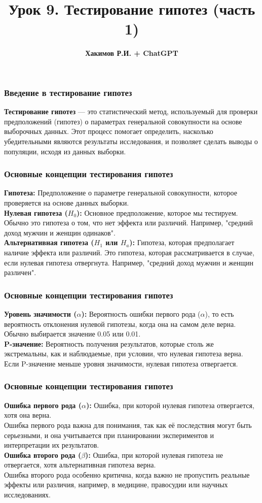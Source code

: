 \documentclass[aspectratio=169]{beamer}
\title{\bf Урок 9. Тестирование гипотез (часть 1)}
\author{{\bf Хакимов Р.И. + ChatGPT}}
\date[\today]{}
\begin{document}
\begin{frame}
\titlepage
\end{frame}

\begin{frame}
\frametitle{Введение в тестирование гипотез}
{\bf Тестирование гипотез} — это статистический метод, используемый для проверки предположений (гипотез) о параметрах генеральной совокупности на основе выборочных данных. Этот процесс помогает определить, насколько убедительными являются результаты исследования, и позволяет сделать выводы о популяции, исходя из данных выборки.
\end{frame}

\begin{frame}
\frametitle{Основные концепции тестирования гипотез}
{\bf Гипотеза:} Предположение о параметре генеральной совокупности, которое проверяется на основе данных выборки.\\  
{\bf Нулевая гипотеза ($H_0$):} Основное предположение, которое мы тестируем. Обычно это гипотеза о том, что нет эффекта или различий. Например, "средний доход мужчин и женщин одинаков".\\
{\bf Альтернативная гипотеза ($H_1$ или $H_a$):} Гипотеза, которая предполагает наличие эффекта или различий. Это гипотеза, которая рассматривается в случае, если нулевая гипотеза отвергнута. Например, "средний доход мужчин и женщин различен".
\end{frame}

\begin{frame}
\frametitle{Основные концепции тестирования гипотез}
{\bf Уровень значимости ($\alpha$):} Вероятность ошибки первого рода ($\alpha$), то есть вероятность отклонения нулевой гипотезы, когда она на самом деле верна. Обычно выбирается значение 0.05 или 0.01.\\
{\bf P-значение:} Вероятность получения результатов, которые столь же экстремальны, как и наблюдаемые, при условии, что нулевая гипотеза верна. Если P-значение меньше уровня значимости, нулевая гипотеза отвергается.
\end{frame}

\begin{frame}
\frametitle{Основные концепции тестирования гипотез}
{\bf Ошибка первого рода ($\alpha$):} Ошибка, при которой нулевая гипотеза отвергается, хотя она верна.\\
Ошибка первого рода важна для понимания, так как её последствия могут быть серьезными, и она учитывается при планировании экспериментов и интерпретации их результатов.
\newline\\
{\bf Ошибка второго рода ($\beta$):} Ошибка, при которой нулевая гипотеза не отвергается, хотя альтернативная гипотеза верна.\\
Ошибка второго рода особенно критична, когда важно не пропустить реальные эффекты или различия, например, в медицине, правосудии или научных исследованиях.
\end{frame}
\end{document}
